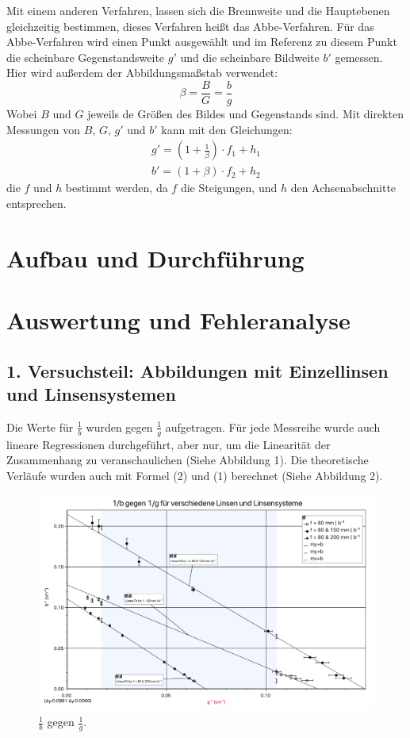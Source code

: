 \documentclass[11pt,a4paper]{article}
\begin{document}
Mit einem anderen Verfahren, lassen sich die Brennweite und die Hauptebenen gleichzeitig bestimmen, dieses Verfahren heißt das Abbe-Verfahren. Für das Abbe-Verfahren wird einen Punkt ausgewählt und im Referenz zu diesem Punkt die scheinbare Gegenstandsweite $g'$ und die scheinbare Bildweite $b'$ gemessen. Hier wird außerdem der Abbildungsmaßstab verwendet: 
$$ \beta = \frac{B}{G} = \frac{b}{g}$$
Wobei $B$ und $G$ jeweils de Größen des Bildes und Gegenstands sind. 
Mit direkten Messungen von $B$, $G$, $g'$ und $b'$ kann mit den Gleichungen:
\begin{equation}
\begin{array}{l}
	g' = (1+\frac{1}{\beta})\cdot f_1 + h_1 \\
	b' = (1+\beta)\cdot f_2 + h_2
\end{array}
\end{equation}
die $f$ und $h$ bestimmt werden, da $f$ die Steigungen, und $h$ den Achsenabschnitte entsprechen. 



\section{Aufbau und Durchführung}



\section{Auswertung und Fehleranalyse}
\subsection{1. Versuchsteil: Abbildungen mit Einzellinsen und Linsensystemen}
Die Werte für $\frac{1}{b}$ wurden gegen $\frac{1}{g}$ aufgetragen. Für jede Messreihe wurde auch lineare Regressionen durchgeführt, aber nur, um die Linearität der Zusammenhang zu veranschaulichen (Siehe Abbildung 1). Die theoretische Verläufe wurden auch mit Formel (2) und (1) berechnet (Siehe Abbildung 2). 
\begin{figure}
	\centering
	\includegraphics[width=\linewidth]{Abb2}
	\caption{$\frac{1}{b}$ gegen $\frac{1}{g}$.}
\end{figure} 
\end{document}
